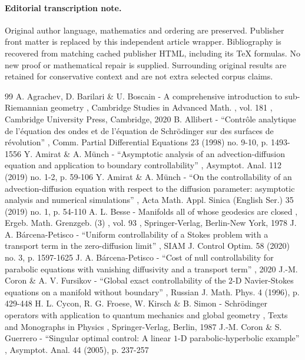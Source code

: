 \documentclass[11pt]{article}
\numberwithin{equation}{section}
\begin{document}
\paragraph{Editorial transcription note.}
Original author language, mathematics and ordering are preserved. Publisher front matter is replaced by this independent article wrapper. Bibliography is recovered from matching cached publisher HTML, including its TeX formulas. No new proof or mathematical repair is supplied. Surrounding original results are retained for conservative context and are not extra selected corpus claims.
\clearpage

\begin{thebibliography}{99}
 A. Agrachev, D. Barilari \& U. Boscain - A comprehensive introduction to sub-Riemannian geometry , Cambridge Studies in Advanced Math. , vol. 181 , Cambridge University Press, Cambridge, 2020
 B. Allibert - “Contrôle analytique de l’équation des ondes et de l’équation de Schrödinger sur des surfaces de révolution” , Comm. Partial Differential Equations 23 (1998) no. 9-10, p. 1493-1556
 Y. Amirat \& A. Münch - “Asymptotic analysis of an advection-diffusion equation and application to boundary controllability” , Asymptot. Anal. 112 (2019) no. 1-2, p. 59-106
 Y. Amirat \& A. Münch - “On the controllability of an advection-diffusion equation with respect to the diffusion parameter: asymptotic analysis and numerical simulations” , Acta Math. Appl. Sinica (English Ser.) 35 (2019) no. 1, p. 54-110
 A. L. Besse - Manifolds all of whose geodesics are closed , Ergeb. Math. Grenzgeb. (3) , vol. 93 , Springer-Verlag, Berlin-New York, 1978
 J. A. Bárcena-Petisco - “Uniform controllability of a Stokes problem with a transport term in the zero-diffusion limit” , SIAM J. Control Optim. 58 (2020) no. 3, p. 1597-1625
 J. A. Bárcena-Petisco - “Cost of null controllability for parabolic equations with vanishing diffusivity and a transport term” , 2020
 J.-M. Coron \& A. V. Fursikov - “Global exact controllability of the $2$-D Navier-Stokes equations on a manifold without boundary” , Russian J. Math. Phys. 4 (1996), p. 429-448
 H. L. Cycon, R. G. Froese, W. Kirsch \& B. Simon - Schrödinger operators with application to quantum mechanics and global geometry , Texts and Monographs in Physics , Springer-Verlag, Berlin, 1987
 J.-M. Coron \& S. Guerrero - “Singular optimal control: A linear $1$-D parabolic-hyperbolic example” , Asymptot. Anal. 44 (2005), p. 237-257

\end{thebibliography}
\end{document}
